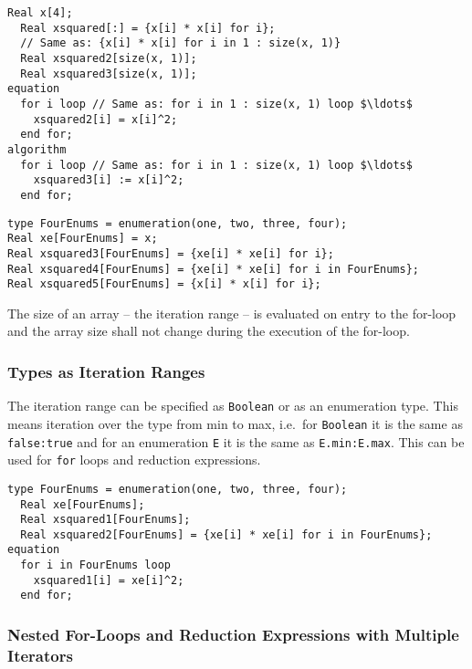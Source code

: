 \begin{example}
\begin{lstlisting}[language=modelica]
  Real x[4];
  Real xsquared[:] = {x[i] * x[i] for i};
  // Same as: {x[i] * x[i] for i in 1 : size(x, 1)}
  Real xsquared2[size(x, 1)];
  Real xsquared3[size(x, 1)];
equation
  for i loop // Same as: for i in 1 : size(x, 1) loop $\ldots$
    xsquared2[i] = x[i]^2;
  end for;
algorithm
  for i loop // Same as: for i in 1 : size(x, 1) loop $\ldots$
    xsquared3[i] := x[i]^2;
  end for;
\end{lstlisting}

\begin{lstlisting}[language=modelica]
type FourEnums = enumeration(one, two, three, four);
Real xe[FourEnums] = x;
Real xsquared3[FourEnums] = {xe[i] * xe[i] for i};
Real xsquared4[FourEnums] = {xe[i] * xe[i] for i in FourEnums};
Real xsquared5[FourEnums] = {x[i] * x[i] for i};
\end{lstlisting}
\end{example}

The size of an array -- the iteration range -- is evaluated on entry to the for-loop and the array size shall not change during the execution of the for-loop.

\subsubsection{Types as Iteration Ranges}\label{types-as-iteration-ranges}

The iteration range can be specified as \lstinline!Boolean! or as an enumeration type.  This means iteration over the type from min to max, i.e.\ for \lstinline!Boolean! it is the same as \lstinline!false:true! and for an enumeration \lstinline!E! it is the same as \lstinline!E.min:E.max!. This can be used for \lstinline!for! loops and reduction expressions.

\begin{example}
\begin{lstlisting}[language=modelica]
  type FourEnums = enumeration(one, two, three, four);
  Real xe[FourEnums];
  Real xsquared1[FourEnums];
  Real xsquared2[FourEnums] = {xe[i] * xe[i] for i in FourEnums};
equation
  for i in FourEnums loop
    xsquared1[i] = xe[i]^2;
  end for;
\end{lstlisting}
\end{example}

\subsubsection{Nested For-Loops and Reduction Expressions with Multiple Iterators}\label{nested-for-loops-and-reduction-expressions-with-multiple-iterators}

